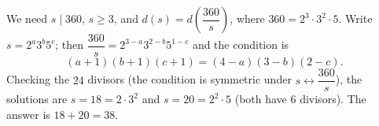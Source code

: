 We need $s\mid360$, $s\ge3$, and $d(s)=d\left(\dfrac{360}{s}\right)$, where $360=2^3\cdot3^2\cdot5$. Write $s=2^a3^b5^c$; then $\dfrac{360}{s}=2^{3-a}3^{2-b}5^{1-c}$ and the condition is
\[(a+1)(b+1)(c+1)=(4-a)(3-b)(2-c).\]
Checking the $24$ divisors (the condition is symmetric under $s\leftrightarrow\dfrac{360}{s}$), the solutions are $s=18=2\cdot3^2$ and $s=20=2^2\cdot5$ (both have $6$ divisors). The answer is $18+20=\boxed{38}$.
